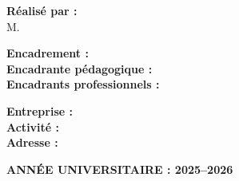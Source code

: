 \begin{titlepage}
\begin{minipage}[t][0.945\textheight]{0.91\textwidth}
\begin{minipage}{0.90\textwidth}
            {\large\bfseries Réalisé par :}\\[0.08cm]
            {\normalsize M. \studentname}

            \vspace{0.48cm}

            {\large\bfseries Encadrement :}\\[0.12cm]
            {\normalsize
            \textbf{Encadrante pédagogique :} \academicsupervisor\\[0.12cm]
            \textbf{Encadrants professionnels :}\\[0.06cm]
            \companysupervisor
            }

            \vspace{0.48cm}

            {\normalsize
            \textbf{Entreprise :} \companyname\\[0.10cm]
            \textbf{Activité :} \companyactivity\\[0.10cm]
            \textbf{Adresse :} \companyaddress
            }
        \end{minipage}

        \vfill

        \begin{center}
            {\normalsize\bfseries ANNÉE UNIVERSITAIRE : 2025--2026}
        \end{center}
        \vspace*{0.10cm}

    \end{minipage}
\end{titlepage}
